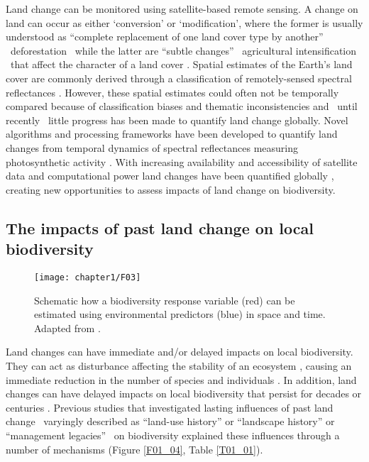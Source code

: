 Land change can be monitored using satellite-based remote sensing. A change on land can occur as either ‘conversion’ or ‘modification’, where the former is usually understood as “complete replacement of one land cover type by another” \textendash\ \ie deforestation \textendash\ while the latter are “subtle changes” \textendash\ \ie agricultural intensification \textendash\ that affect the character of a land cover \citep{Lambin2003,Lambin2006}. Spatial estimates of the Earth’s land cover are commonly derived through a classification of remotely-sensed spectral reflectances \citep{DeFries1994,Hansen2000,DiGregorio2000}. However, these spatial estimates could often not be temporally compared because of classification biases and thematic inconsistencies \citep{VERBURG2011,Estes2018} and \textendash\ until recently \textendash\ little progress has been made to quantify land change globally. Novel algorithms and processing frameworks have been developed to quantify land changes from temporal dynamics of spectral reflectances measuring photosynthetic activity \citep[Figure \ref{F01_02}\textbf{c}, ][]{Lhermitte2011,Gomez2016,Zhu2017}. With increasing availability and accessibility of satellite data \citep{Wulder2015} and computational power \citep{Gorelick2017} land changes have been quantified globally \citep{Hansen2013,Pekel2016,Li2018,Song2018}, creating new opportunities to  assess impacts of land change on biodiversity.   


\subsection{The impacts of past land change on local biodiversity}
\label{C01_0102}

\begin{wrapfigure}{r}{0.5\textwidth}
  \begin{flushright}
    \texttt{[image: chapter1/F03]}
  \end{flushright}
  \caption{ Schematic how a biodiversity response variable (red) can be estimated using environmental predictors (blue) in space and time. Adapted from \cite{Ferrier2017}. }
  \label{F01_03}
\end{wrapfigure}

Land changes can have immediate and/or delayed impacts on local biodiversity. They can act as disturbance affecting the stability of an ecosystem \citep{Pimm1984,Scheffer2003}, causing an immediate reduction in the number of species and individuals \citep{Nimmo2015,Ratajczak2018}. In addition, land changes can have delayed impacts on local biodiversity that persist for decades \citep{Martin2013,Moreno-Mateos2017} or centuries \citep{Vegas-Vilarrubia2011,McMichael2017}. Previous studies that investigated lasting influences of past land change \textendash\ varyingly described as “land-use history” or “landscape history” \citep{Bellemare2002,Foster2003,Ewers2013} or “management legacies” \citep{Perring2015} \textendash\ on biodiversity explained these influences through a number of mechanisms (Figure \ref{F01_04}, Table \ref{T01_01}).

